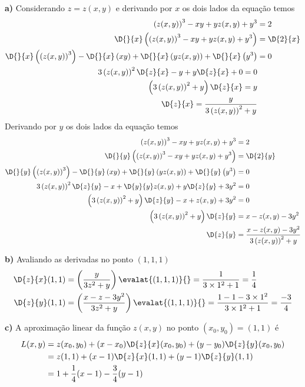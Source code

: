 \documentclass[a4paper,12pt,fleqn]{article}
\begin{document}
\begin{answer}
\vspace{\baselineskip}
\textbf{a)\;}
Considerando $z=z(x, y)$ e derivando por $x$ os dois lados da equação temos
\begin{align*}
  \left(z(x, y)\right)^3 - xy + yz(x, y) + y^3 & = 2 \\
  \D{}{x}\left(\left(z(x, y)\right)^3 - xy + yz(x, y) + y^3\right) & = \D{2}{x} \\
  \D{}{x}\left(\left(z(x, y)\right)^3\right) -
  \D{}{x}\left(xy\right) +
  \D{}{x}\left(yz(x, y)\right) +
  \D{}{x}\left(y^3\right) & = 0 \\
  3\left(z(x, y)\right)^2\D{z}{x} -y +y\D{z}{x} + 0 = 0 \\
  \left(3\left(z(x, y)\right)^2 + y\right)\D{z}{x} = y \\
  \D{z}{x} = \frac{y}{3\left(z(x, y)\right)^2 + y}
\end{align*}
Derivando por $y$ os dois lados da equação temos
\begin{align*}
  \left(z(x, y)\right)^3 - xy + yz(x, y) + y^3 & = 2 \\
  \D{}{y}\left(\left(z(x, y)\right)^3 - xy + yz(x, y) + y^3\right) & = \D{2}{y} \\
  \D{}{y}\left(\left(z(x, y)\right)^3\right) -
  \D{}{y}\left(xy\right) +
  \D{}{y}\left(yz(x, y)\right) +
  \D{}{y}\left(y^3\right) & = 0 \\
  3\left(z(x, y)\right)^2\D{z}{y} -x + \D{y}{y}z(x, y) + y\D{z}{y} + 3y^2 & = 0 \\
  \left(3\left(z(x, y)\right)^2+y\right)\D{z}{y} -x +z(x, y) +3y^2 & = 0 \\
  \left(3\left(z(x, y)\right)^2+y\right)\D{z}{y} & = x -z(x, y) -3y^2 \\
  \D{z}{y} & = \frac{x -z(x, y) -3y^2}{3\left(z(x, y)\right)^2+y}
\end{align*}

\vspace{\baselineskip}
\textbf{b)\;}
Avaliando as derivadas no ponto \((1, 1, 1)\)
\begin{align*}
  \D{z}{x}(1, 1)
  & = \left(\frac{y}{3z^2 + y}\right)\evalat{(1, 1, 1)}{}
    = \frac{1}{3\times 1^2 + 1}
    = \frac{1}{4}
  \\
  \D{z}{y}(1, 1)
  & = \left(\frac{x -z -3y^2}{3z^2+y}\right)\evalat{(1, 1, 1)}{}
    = \frac{1 -1 -3\times 1^2}{3\times 1^2 + 1}
    = \frac{-3}{4}
\end{align*}

\vspace{\baselineskip}
\textbf{c)\;}
A aproximação linear da função $z(x, y)$ no ponto \((x_0, y_0) = (1, 1)\) é
\begin{align*}
  L(x, y)
  & = z(x_0, y_0) + (x-x_0)\D{z}{x}(x_0, y_0) + (y-y_0)\D{z}{y}(x_0, y_0) \\
  & = z(1, 1) + (x-1)\D{z}{x}(1, 1) + (y-1)\D{z}{y}(1, 1) \\
  & = 1 + \frac{1}{4}(x-1) - \frac{3}{4}(y-1)
\end{align*}
\end{answer}
\end{document}
